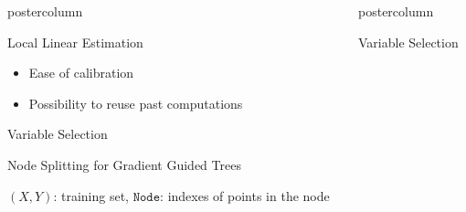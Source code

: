 \documentclass[dvipsnames]{beamer}
\newlength{\columnheight}
\begin{document}
\begin{frame}
\begin{columns}
\begin{column}{.5\textwidth}
\begin{beamercolorbox}[center]{postercolumn}
\begin{minipage}{.98\textwidth}
{\begin{myblock}{Local Linear Estimation}
\begin{itemize}
                                \item Ease of calibration
                                \item Possibility to reuse past computations
                            \end{itemize}
                    \end{myblock}
                    \begin{myblock}{Variable Selection}
                        \begin{algorithm}[H]
                            \caption{Node Splitting for Gradient Guided Trees}\label{alg:LocalLinearTree}
                            \begin{algorithmic}[1] %
                                \Require $(X, Y)$: training set, $\texttt{Node}$: indexes of points in the node
                            \end{algorithmic}
                        \end{algorithm}
                    \end{myblock}\vfill
            }\end{minipage}\end{beamercolorbox}
    \end{column}
	\begin{column}{.5\textwidth}
		\begin{beamercolorbox}[center]{postercolumn}
			\begin{minipage}{.98\textwidth} %
				\parbox[t][\columnheight]{\textwidth}{ %
                    \begin{myblock}{Variable Selection}
                        \begin{table}[H]
                            \centering
                            \begin{tabular}{lrrrr}

\end{tabular}
\end{table}
\end{myblock}}
\end{minipage}
\end{beamercolorbox}
\end{column}
\end{columns}
\end{frame}
\end{document}

